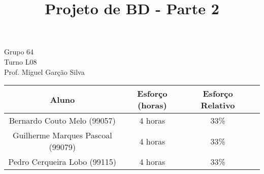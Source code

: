 \documentclass{article}
\title{{\Huge Projeto de BD - Parte 2}}
\author{}
\date{}
\begin{document}
	\maketitle
	\begin{center}
		{\LARGE Grupo 64}\\
		\vspace{8mm}
		{\LARGE Turno L08}\\
		\vspace{8mm}
		{\LARGE Prof. Miguel Garção Silva}\\

		\vspace{7cm}

		\begin{tabular}{|c|c|c|c|} \hline
			\textbf{Aluno} & \textbf{Esforço (horas)} & \textbf{Esforço Relativo}\\ \hline
			Bernardo Couto Melo (99057)	& 4 horas & 33\%\\ \hline
			Guilherme Marques Pascoal (99079) & 4 horas & 33\%\\ \hline
			Pedro Cerqueira Lobo (99115) & 4 horas & 33\%\\ \hline
		\end{tabular}

	\end{center}

	\pagebreak

\end{document}
